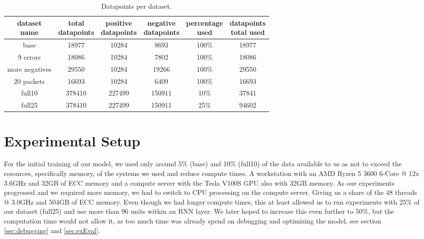 \documentclass[
	ngerman,
	ruledheaders=section,%
	class=report,%
	thesis={type=bachelor},%
	accentcolor=9c,%
	custommargins=true,%
	marginpar=false,%
	parskip=half-,%
	fontsize=11pt,%
	twoside
]{tudapub}
\begin{document}
\begin{table}
    \centering
    \begin{tabular}{|c|c|c|c|c|c|}
        \hline
        \shortstack{dataset\\ \textbf{name}} & \shortstack{\textbf{total}\\ datapoints} & \shortstack{\textbf{positive}\\ datapoints} & \shortstack{\textbf{negative}\\ datapoints} & \shortstack{\textbf{percentage}\\ \textbf{used}} & \shortstack{datapoints\\ \textbf{total used}} \\
        \hline
        base & 18977 & 10284 & 8693 & 100\% & 18977 \\
        \hline
        9 errors & 18086 & 10284 & 7802 & 100\% & 18086 \\
        \hline
        more negatives & 29550 & 10284 & 19266 & 100\% & 29550 \\
        \hline
        20 packets & 16693 & 10284 & 6409 & 100\% & 16693 \\
        \hline
        full10 & 378410 & 227499 & 150911 & 10\% & 37841 \\
        \hline
        full25 & 378410 & 227499 & 150911 & 25\% & 94602 \\
        \hline
    \end{tabular}
    \caption{Datapoints per dataset.}
    \label{tab:datapoints}
\end{table}

\section{Experimental Setup}
\label{sec:exSetup}
\label{sec:exTrainTest}


For the initial training of our model, we used only around 5\% (base) and 10\% (full10) of the data available to us as not to exceed the resources, specifically memory, of the systems we used and reduce compute times.
A workstation with an AMD Ryzen 5 3600 6-Core @ 12x 3.6GHz and 32GB of ECC memory and a compute server with the Tesla V100S GPU also with 32GB memory.
As our experiments progressed and we required more memory, we had to switch to CPU processing on the compute server.
Giving us a share of the 48 threads @ 3.0GHz and 504GB of ECC memory.
Even though we had longer compute times, this at least allowed us to run experiments with 25\% of our dataset (full25) and use more than 96 units within an RNN layer.
We later hoped to increase this even further to 50\%, but the computation time would not allow it, as too much time was already spend on debugging and optimizing the model, see section \ref{sec:debugging} and \ref{sec:exEval}.
\end{document}
